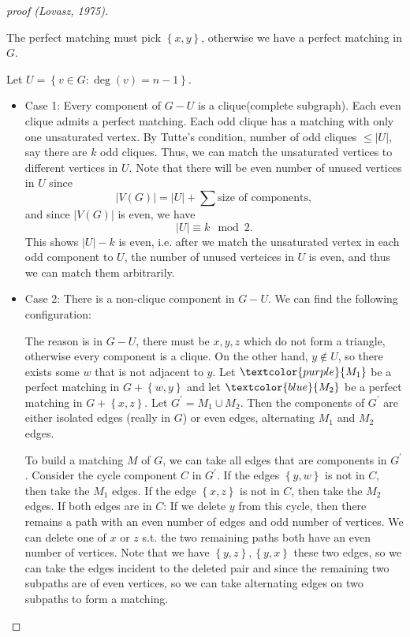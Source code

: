 \begin{proof}[proof (Lovasz, 1975)]
    \begin{remark}
        The perfect matching must pick \(\left\{ x, y \right\} \), otherwise we have a perfect matching in \(G\).  
    \end{remark}
    Let \(U = \left\{ v \in G: \deg(v) = n - 1 \right\} \). 
    \begin{itemize}
        \item Case 1: Every component of \(G - U\) is a clique(complete subgraph). Each even clique admits a perfect matching. Each odd clique has a matching with only one unsaturated vertex. By Tutte's condition, number of odd cliques \(\le \vert U \vert \), say there are \(k\) odd cliques. Thus, we can match the unsaturated vertices to different vertices in \(U\). Note that there will be even number of unused vertices in \(U\) since
        \[
            \vert V(G) \vert = \vert U \vert + \sum \text{size of components},    
        \]
        and since \(\vert V(G) \vert \) is even, we have 
        \[
            \vert U \vert \equiv k \mod{2}. 
        \]
        This shows \(\vert U \vert - k \) is even, i.e. after we match the unsaturated vertex in each odd component to \(U\), the number of unused verteices in \(U\) is even,  and thus we can match them arbitrarily.  
        \item Case 2: There is a non-clique component in \(G - U\). We can find the following configuration:
        \begin{figure}[H]
            \centering
        \end{figure}
        The reason is in \(G - U\), there must be \(x, y, z\) which do not form a triangle, otherwise every component is a clique. On the other hand, \(y \notin U\), so there exists some \(w\) that is not adjacent to \(y\).     
        Let \(\textcolor{purple}{M_1}\) be a perfect matching in \(G + \left\{ w, y \right\} \) and let \(\textcolor{blue}{M_2}\) be a perfect matching in \(G + \left\{ x, z \right\} \). Let \(G^{\prime} = M_1 \cup M_2\). Then the components of \(G^{\prime} \) are either isolated edges (really in \(G\)) or even edges, alternating \(M_1\) and \(M_2\) edges. 
        \begin{figure}[H]
            \centering
        \end{figure}
        To build a matching \(M\) of \(G\), we can take all edges that are components in \(G^{\prime}\). Consider the cycle component \(C\) in \(G^{\prime} \). If the edges \(\left\{ y, w \right\} \) is not in \(C\), then take the \(M_1\) edges. If the edge \(\left\{ x, z \right\} \) is not in \(C\), then take the \(M_2\) edges. If both edges are in \(C\): If we delete \(y\) from this cycle, then there remains a path with an even number of edges and odd number of vertices. We can delete one of \(x\) or \(z\) s.t. the two remaining paths both have an even number of vertices. Note that we have \(\left\{ y, z \right\}, \left\{ y, x \right\}  \) these two edges, so we can take the edges incident to the deleted pair and since the remaining two subpaths are of even vertices, so we can take alternating edges on two subpaths to form a matching.                          

\end{itemize}
\end{proof}

